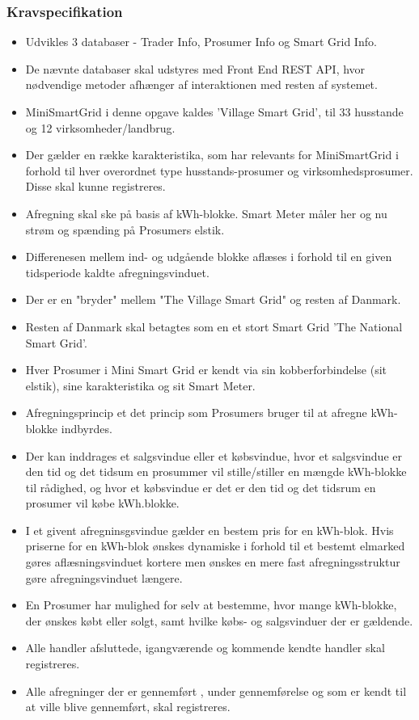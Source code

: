\subsubsection{Kravspecifikation}

\begin{itemize}
    \item Udvikles 3 databaser - Trader Info, Prosumer Info og Smart Grid Info.
    \item De nævnte databaser skal udstyres med Front End REST API, hvor nødvendige metoder afhænger af interaktionen med resten af systemet.
    \item MiniSmartGrid i denne opgave kaldes 'Village Smart Grid', til 33 husstande og 12 virksomheder/landbrug.
    \item Der gælder en række karakteristika, som har relevants for MiniSmartGrid i forhold til hver overordnet type husstands-prosumer og virksomhedsprosumer. Disse skal kunne registreres.
    \item Afregning skal ske på basis af kWh-blokke. Smart Meter måler her og nu strøm og spænding på Prosumers elstik.
    \item Differenesen mellem ind- og udgående blokke aflæses i forhold til en given tidsperiode kaldte afregningsvinduet.
    \item Der er en "bryder" mellem "The Village Smart Grid" og resten af Danmark. 
    \item Resten af Danmark skal  betagtes som en et stort Smart Grid 'The National Smart Grid'.
    \item Hver Prosumer i Mini Smart Grid er kendt via sin kobberforbindelse (sit elstik), sine karakteristika og sit Smart Meter.
    \item Afregningsprincip et det princip som Prosumers bruger til at afregne kWh-blokke indbyrdes.
    \item Der kan inddrages et salgsvindue eller et købsvindue, hvor et salgsvindue er den tid og det tidsum en prosummer vil stille/stiller en mængde kWh-blokke til rådighed, og hvor et købsvindue er det er den tid og det tidsrum en prosumer vil købe kWh.blokke.
    \item I et givent afregninsgsvindue gælder en bestem pris for en kWh-blok. Hvis priserne for en kWh-blok ønskes dynamiske i forhold til et bestemt elmarked gøres aflæsningsvinduet kortere men ønskes en mere fast afregningsstruktur gøre afregningsvinduet længere.
    \item En Prosumer har mulighed for selv at bestemme, hvor mange kWh-blokke, der ønskes købt eller solgt, samt hvilke købs- og salgsvinduer der er gældende.
    \item Alle handler afsluttede, igangværende og kommende kendte handler skal registreres.
    \item Alle afregninger der er gennemført , under gennemførelse og som er kendt til at ville blive gennemført, skal registreres.
\end{itemize}


